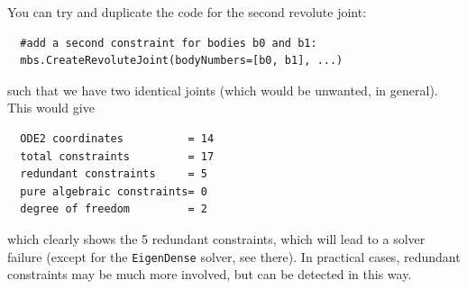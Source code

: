 \noindent You can try and duplicate the code for the second revolute joint:
\pythonstyle\begin{lstlisting}
  #add a second constraint for bodies b0 and b1:
  mbs.CreateRevoluteJoint(bodyNumbers=[b0, b1], ...)
\end{lstlisting}
such that we have two identical joints (which would be unwanted, in general). This would give 
\begin{lstlisting}
  ODE2 coordinates          = 14
  total constraints         = 17
  redundant constraints     = 5
  pure algebraic constraints= 0
  degree of freedom         = 2
\end{lstlisting}
which clearly shows the 5 redundant constraints, which will lead to a solver failure (except for the \texttt{EigenDense} solver, see there). In practical cases, redundant constraints may be much more involved, but can be detected in this way.

